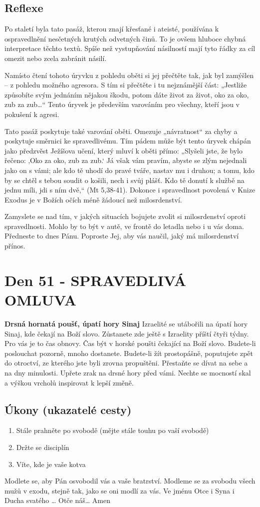 \documentclass[11pt]{article}
\newcommand{\zacatekOsmyTyden}{
  \textbf{Drsná hornatá poušť, úpatí hory Sinaj} \newline 
  Izraelité se utábořili na úpatí hory Sinaj, kde čekají na Boží slovo. Zůstanete zde ještě s Izraelity příští čtyři týdny. Pro vás je to čas obnovy. Čas být v horské poušti čekající na Boží slovo. Budete-li poslouchat pozorně, mnoho dostanete. Budete-li žít prostopášně, poputujete zpět do otroctví, ze kterého jste byli zrovna propuštěni. Přestaňte se dívat na sebe a na dny minulosti. Upřete zrak na drsné hory před vámi. Nechte se mocností skal a výškou vrcholů inspirovat k lepší změně.
  \subsection*{Úkony (ukazatelé cesty)}
\begin{enumerate}
  \item Stále prahněte po svobodě (mějte stále touhu po vaší svobodě)
  \item Držte se disciplín
  \item Víte, kde je vaše kotva
\end{enumerate}
Modlete se, aby Pán osvobodil vás a vaše bratrství. \newline
Modleme se za svobodu všech mužů v exodu, stejně tak, jako se oni modlí za vás.\newline
Ve jménu Otce i Syna i Ducha svatého …  Otče náš… Amen
}
\begin{document}
\subsection*{Reflexe}
Po staletí byla tato pasáž, kterou znají křesťané i ateisté, používána k ospravedlnění nesčetných krutých odvetných činů. To je
ovšem hluboce chybná interpretace těchto textů. Spíše než vystupňování násilností mají tyto řádky za cíl omezit nebo zcela
zabránit násilí.

Namísto čtení tohoto úryvku z pohledu oběti si jej přečtěte tak, jak byl zamýšlen – z pohledu možného agresora. S tím si přečtěte i
tu nejznámější část: „Jestliže způsobíte svým jednáním nějakou škodu, potom dáte život za život, oko za oko, zub za zub…“ Tento
úryvek je především varováním pro všechny, kteří jsou v pokušení k agresi.

Tato pasáž poskytuje také varování oběti. Omezuje „návratnost“ za chyby a poskytuje směrnici ke spravedlivému. Tím pádem
může být tento úryvek chápán jako předzvěst Ježíšova učení, který mluví k oběti přímo: „Slyšeli jste, že bylo řečeno: ‚Oko za oko,
zub za zub.‘ Já však vám pravím, abyste se zlým nejednali jako on s vámi; ale kdo tě uhodí do pravé tváře, nastav mu i druhou; a
tomu, kdo by se chtěl s tebou soudit o košili, nech i svůj plášť. Kdo tě donutí k službě na jednu míli, jdi s ním dvě,“ (Mt 5,38-41). 
Dokonce i spravedlnost povolená v Knize Exodus je v Božích očích méně žádoucí než milosrdenství.

Zamyslete se nad tím, v jakých situacích bojujete zvolit si milosrdenství oproti spravedlnosti. Mohlo by to být v autě, ve frontě do
letadla nebo i u vás doma. Předneste to dnes Pánu. Poproste Jej, aby vás naučil, jaký má milosrdenství přínos.

\newpage
\section{Den 51 - SPRAVEDLIVÁ OMLUVA}
\zacatekOsmyTyden
\end{document}
